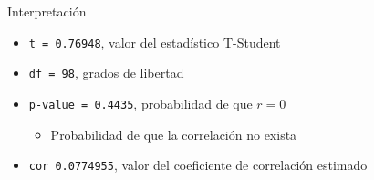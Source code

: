 \documentclass[
  11pt,
  ignorenonframetext,
]{beamer}
\providecommand{\tightlist}{%
  \setlength{\itemsep}{0pt}\setlength{\parskip}{0pt}}
\begin{document}
\begin{frame}[fragile]{Interpretación}
\protect\hypertarget{interpretaciuxf3n}{}
\begin{itemize}
\item
  \texttt{t\ =\ 0.76948}, valor del estadístico T-Student
\item
  \texttt{df\ =\ 98}, grados de libertad
\item
  \texttt{p-value\ =\ 0.4435}, probabilidad de que \(r = 0\)

  \begin{itemize}
  \tightlist
  \item
    Probabilidad de que la correlación no exista
  \end{itemize}
\item
  \texttt{cor\ 0.0774955}, valor del coeficiente de correlación estimado
\end{itemize}
\end{frame}
\end{document}
